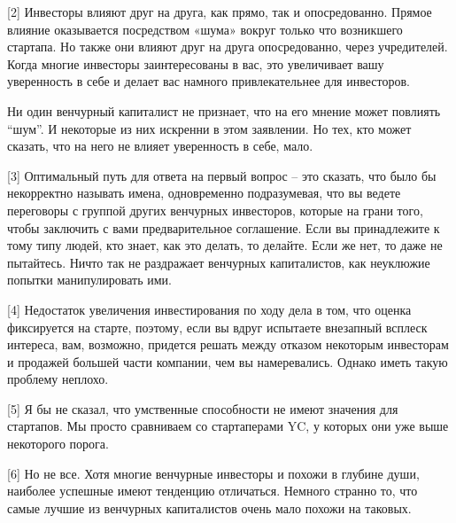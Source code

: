 \documentclass[ebook,12pt,oneside,openany]{memoir}
\begin{document}
[2] Инвесторы влияют друг на друга, как прямо, так и опосредованно.
Прямое влияние оказывается посредством «шума» вокруг только что
возникшего стартапа. Но также они влияют друг на друга опосредованно,
через учредителей. Когда многие инвесторы заинтересованы в вас, это
увеличивает вашу уверенность в себе и делает вас намного
привлекательнее для инвесторов.

Ни один венчурный капиталист не признает, что на его мнение может
повлиять “шум”. И некоторые из них искренни в этом заявлении. Но тех,
кто может сказать, что на него не влияет уверенность в себе, мало.

[3] Оптимальный путь для ответа на первый вопрос – это сказать, что
было бы некорректно называть имена, одновременно подразумевая, что вы
ведете переговоры с группой других венчурных инвесторов, которые на
грани того, чтобы заключить с вами предварительное соглашение. Если вы
принадлежите к тому типу людей, кто знает, как это делать, то делайте.
Если же нет, то даже не пытайтесь. Ничто так не раздражает венчурных
капиталистов, как неуклюжие попытки манипулировать ими.

[4] Недостаток увеличения инвестирования по ходу дела в том, что
оценка фиксируется на старте, поэтому, если вы вдруг испытаете
внезапный всплеск интереса, вам, возможно, придется решать между
отказом некоторым инвесторам и продажей большей части компании, чем вы
намеревались. Однако иметь такую проблему неплохо.

[5] Я бы не сказал, что умственные способности не имеют значения для
стартапов. Мы просто сравниваем со стартаперами YC, у которых они уже
выше некоторого порога.

[6] Но не все. Хотя многие венчурные инвесторы и похожи в глубине
души, наиболее успешные имеют тенденцию отличаться. Немного странно
то, что самые лучшие из венчурных капиталистов очень мало похожи на
таковых.
\end{document}
